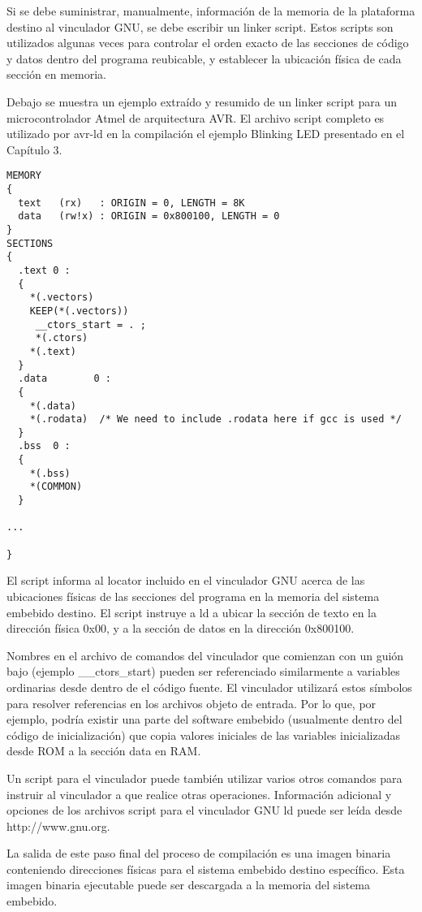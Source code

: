 \documentclass[12pt]{article}
\begin{document}
Si se debe suministrar, manualmente, información de la memoria de la plataforma destino
al vinculador  GNU, se debe escribir un linker script.
Estos scripts son utilizados algunas veces para controlar el orden exacto de
las secciones de código y datos dentro del programa reubicable, y establecer
la ubicación física de cada sección en memoria.


Debajo se muestra un ejemplo extraído y resumido de un linker script
para un microcontrolador Atmel de arquitectura AVR. El archivo script
completo es utilizado por avr-ld en la compilación el ejemplo Blinking LED
presentado en el Capítulo 3.

\begin{verbatim}
MEMORY
{
  text   (rx)   : ORIGIN = 0, LENGTH = 8K
  data   (rw!x) : ORIGIN = 0x800100, LENGTH = 0
}
SECTIONS
{
  .text 0 :
  {
    *(.vectors)
    KEEP(*(.vectors))
     __ctors_start = . ;
     *(.ctors)
    *(.text)
  }
  .data        0 :
  {
    *(.data)
    *(.rodata)  /* We need to include .rodata here if gcc is used */
  }
  .bss  0 :
  {
    *(.bss)
    *(COMMON)
  }

...

}
\end{verbatim}

El script informa al locator incluido en el vinculador GNU acerca de las ubicaciones
físicas de las secciones del programa en la memoria del sistema embebido destino.
El script instruye a ld a ubicar la sección de texto en la dirección física 0x00,
y a la sección de datos en la dirección 0x800100.

Nombres en el archivo de comandos del vinculador que comienzan con un guión bajo
(ejemplo \_\_ctors\_start) pueden ser referenciado similarmente a variables ordinarias
desde dentro de el código fuente. El vinculador utilizará estos símbolos
para resolver referencias en los archivos objeto de entrada.
Por lo que, por ejemplo, podría existir una parte del software embebido (usualmente
dentro del código de inicialización) que copia valores iniciales de las variables
inicializadas desde ROM a la sección data en RAM.

Un script para el vinculador puede también utilizar varios otros comandos
para instruir al vinculador a que realice otras operaciones.
Información adicional y opciones de los archivos script para el vinculador GNU ld
puede ser leída desde http://www.gnu.org.

La salida de este paso final del proceso de compilación es una imagen binaria
conteniendo direcciones físicas para el sistema embebido destino específico.
Esta imagen binaria ejecutable puede ser descargada a la memoria del sistema embebido.
\end{document}
